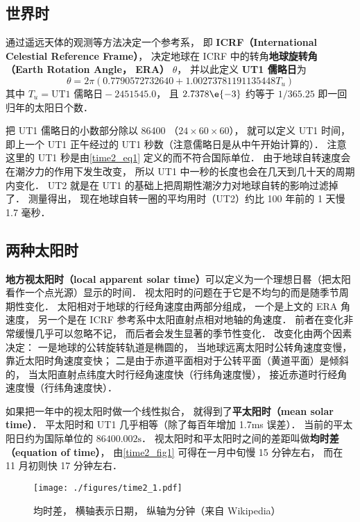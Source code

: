 

\subsection{世界时}
通过遥远天体的观测等方法决定一个参考系， 即 \textbf{ICRF（International Celestial Reference Frame）}， 决定地球在 ICRF 中的转角\textbf{地球旋转角（Earth Rotation Angle， ERA）} $\theta$， 并以此定义 \textbf{UT1 儒略日}为
\begin{equation}\label{time2_eq1}
\theta = 2\pi(0.7790572732640 + 1.00273781191135448 T_u)
\end{equation}
其中 $T_u = \text{UT1 儒略日} - 2451545.0$， 且 $2.7378\e{-3}$ 约等于 $1/365.25$ 即一回归年的太阳日个数．

把 UT1 儒略日的小数部分除以 86400 （$24\times 60\times 60$）， 就可以定义 UT1 时间， 即上一个 UT1 正午经过的 UT1 秒数（注意儒略日是从中午开始计算的）． 注意这里的 UT1 秒是由\autoref{time2_eq1} 定义的而不符合国际单位． 由于地球自转速度会在潮汐力的作用下发生改变， 所以 UT1 中一秒的长度也会在几天到几十天的周期内变化． UT2 就是在 UT1 的基础上把周期性潮汐力对地球自转的影响过滤掉了． 测量得出， 现在地球自转一圈的平均用时（UT2）约比 100 年前的 1 天慢 1.7 毫秒．

\subsection{两种太阳时}
\textbf{地方视太阳时（local apparent solar time）}可以定义为一个理想日晷（把太阳看作一个点光源）显示的时间． 视太阳时的问题在于它是不均匀的而是随季节周期性变化． 太阳相对于地球的行经角速度由两部分组成， 一个是上文的 ERA 角速度， 另一个是在 ICRF 参考系中太阳直射点相对地轴的角速度． 前者在变化非常缓慢几乎可以忽略不记， 而后者会发生显著的季节性变化． 改变化由两个因素决定： 一是地球的公转旋转轨道是椭圆的， 当地球远离太阳时公转角速度变慢， 靠近太阳时角速度变快； 二是由于赤道平面相对于公转平面（黄道平面）是倾斜的， 当太阳直射点纬度大时行经角速度快（行纬角速度慢）， 接近赤道时行经角速度慢（行纬角速度快）．

如果把一年中的视太阳时做一个线性拟合， 就得到了\textbf{平太阳时（mean solar time）}． 平太阳时和 UT1 几乎相等（除了每百年增加 1.7ms 误差）． 当前的平太阳日约为国际单位的 $86400.002\mathrm{s}$． 视太阳时和平太阳时之间的差距叫做\textbf{均时差（equation of time）}， 由\autoref{time2_fig1} 可得在一月中旬慢 15 分钟左右， 而在 11 月初则快 17 分钟左右．

\begin{figure}[ht]
\centering
\texttt{[image: ./figures/time2\_1.pdf]}
\caption{均时差， 横轴表示日期， 纵轴为分钟（来自 Wikipedia）} \label{time2_fig1}
\end{figure}
